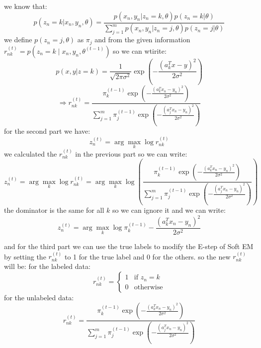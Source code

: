 \begin{qsolve}
    \begin{qsolve}[]
        we know that:
        $$p(z_n=k|x_n,y_n,\theta) = \frac{p(x_n,y_n|z_n=k,\theta)p(z_n=k|\theta)}{\sum_{j=1}^{m}p(x_n,y_n|z_n=j,\theta)p(z_n=j|\theta)}$$
        we define $p(z_n=j,\theta)$ as $\pi_j$ and from the given information $r_{nk}^{(t)} = p \left( z_n = k \mid x_n, y_n, \theta^{(t-1)} \right)$ so we can wtirite:
        $$p(x,y|z=k) = \frac{1}{\sqrt{2\pi\sigma^2}} \exp \left( -\frac{\left( a_k^T x - y \right)^2}{2\sigma^2} \right)$$
        $$\Rightarrow r_{nk}^{(t)} = \frac{\pi_k^{(t-1)}\exp \left( -\frac{\left( a_k^T x_n - y_n \right)^2}{2\sigma^2} \right)}{\sum_{j=1}^{m}\pi_j^{(t-1)}\exp \left( -\frac{\left( a_j^T x_n - y_n \right)^2}{2\sigma^2} \right)}$$
        for the second part we have:
        $$z_n^{(t)} = \arg \max_{k} \log r_{nk}^{(t)}$$
        we calculated the $r_{nk}^{(t)}$ in the previous part so we can write:
        $$z_n^{(t)} = \arg \max_{k} \log r_{nk}^{(t)} = \arg \max_{k} \log \left( \frac{\pi_k^{(t-1)}\exp \left( -\frac{\left( a_k^T x_n - y_n \right)^2}{2\sigma^2} \right)}{\sum_{j=1}^{m}\pi_j^{(t-1)}\exp \left( -\frac{\left( a_j^T x_n - y_n \right)^2}{2\sigma^2} \right)} \right)$$
        the dominator is the same for all $k$ so we can ignore it and we can write:
        $$z_n^{(t)} = \arg \max_{k} \log \pi_k^{(t-1)} - \frac{\left( a_k^T x_n - y_n \right)^2}{2\sigma^2}$$
        
        and for the third part we can use the true labels to modify the E-step of Soft EM by setting the $r_{nk}^{(t)}$ to 1 for the true label and 0 for the others. so the new $r_{nk}^{(t)}$ will be:
        \splitqsolve[\splitqsolve]
        for the labeled data:
        $$r_{nk}^{(t)} = \begin{cases} 1 & \text{if } z_n = k \\ 0 & \text{otherwise} \end{cases}$$
        for the unlabeled data:
        $$r_{nk}^{(t)} = \frac{\pi_k^{(t-1)}\exp \left( -\frac{\left( a_k^T x_n - y_n \right)^2}{2\sigma^2} \right)}{\sum_{j=1}^{m}\pi_j^{(t-1)}\exp \left( -\frac{\left( a_j^T x_n - y_n \right)^2}{2\sigma^2} \right)}$$
    \end{qsolve}
\end{qsolve}